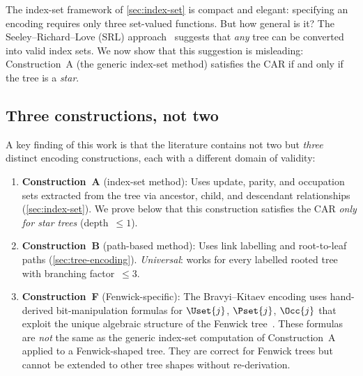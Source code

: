 %

The index-set framework of \cref{sec:index-set} is compact and
elegant: specifying an encoding requires only three set-valued
functions.  But how general is it?  The Seeley--Richard--Love (SRL)
approach~\cite{seeley2012} suggests that \emph{any} tree can be
converted into valid index sets.  We now show that this suggestion is
misleading: Construction~A (the generic index-set method) satisfies the
CAR if and only if the tree is a \emph{star}.

\subsection{Three constructions, not two}
\label{sec:st-three}

A key finding of this work is that the literature contains not two but
\emph{three} distinct encoding constructions, each with a different
domain of validity:

\begin{enumerate}
  \item \textbf{Construction~A} (index-set method): Uses update,
    parity, and occupation sets extracted from the tree via ancestor,
    child, and descendant relationships
    (\cref{sec:index-set}).  We prove below that this construction
    satisfies the CAR \emph{only for star trees} (depth~$\le 1$).

  \item \textbf{Construction~B} (path-based method): Uses link
    labelling and root-to-leaf paths
    (\cref{sec:tree-encoding}).  \emph{Universal}: works for every
    labelled rooted tree with branching factor~$\le 3$.

  \item \textbf{Construction~F} (Fenwick-specific): The
    Bravyi--Kitaev encoding uses hand-derived bit-manipulation formulas
    for $\Uset{j}$, $\Pset{j}$, $\Occ{j}$ that exploit the unique
    algebraic structure of the Fenwick tree~\cite{fenwick1994}.  These
    formulas are \emph{not} the same as the generic index-set
    computation of Construction~A applied to a Fenwick-shaped tree.
    They are correct for Fenwick trees but cannot be extended to
    other tree shapes without re-derivation.
\end{enumerate}

